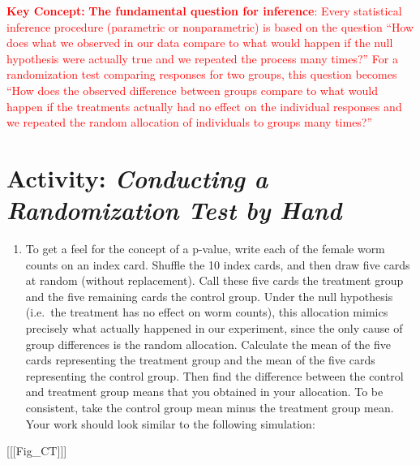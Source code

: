 \documentclass[
]{report}
\providecommand{\tightlist}{%
  \setlength{\itemsep}{0pt}\setlength{\parskip}{0pt}}
\theoremstyle{definition}
\theoremstyle{definition}
\theoremstyle{definition}
\theoremstyle{definition}
\theoremstyle{remark}
\begin{document}
\Large

\textbf{\textcolor{red}{Key Concept:}}
\textcolor{red}{\textbf{The fundamental question for inference}: Every statistical inference procedure (parametric or nonparametric) is based on the question “How does what we observed in our data compare to what
would happen if the null hypothesis were actually true and we repeated the process many times?”
For a randomization test comparing responses for two groups, this question becomes “How does
the observed difference between groups compare to what would happen if the treatments actually
had no effect on the individual responses and we repeated the random allocation of individuals to
groups many times?”}

\normalsize

\hypertarget{activity-conducting-a-randomization-test-by-hand}{%
\section*{\texorpdfstring{Activity: \emph{Conducting a Randomization Test by Hand}}{Activity: Conducting a Randomization Test by Hand}}\label{activity-conducting-a-randomization-test-by-hand}}

\begin{enumerate}
\def\labelenumi{\arabic{enumi}.}
\setcounter{enumi}{2}
\tightlist
\item
  To get a feel for the concept of a p-value, write each of the female worm counts on an index card.
  Shuffle the 10 index cards, and then draw five cards at random (without replacement). Call these five
  cards the treatment group and the five remaining cards the control group. Under the null hypothesis
  (i.e.~the treatment has no effect on worm counts), this allocation mimics precisely what actually happened
  in our experiment, since the only cause of group differences is the random allocation.
  \textbar{} Calculate the mean of the five cards representing the treatment group and the mean of the five
  cards representing the control group. Then find the difference between the control and treatment group means that you obtained in your allocation. To be consistent, take the control group mean minus the
  treatment group mean. Your work should look similar to the following simulation:
\end{enumerate}

{[}{[}{[}Fig\_CT{]}{]}{]}
\end{document}
